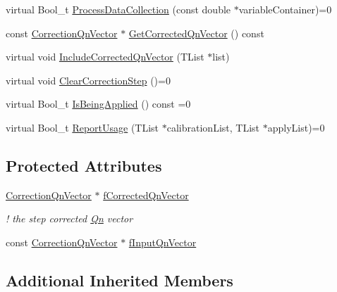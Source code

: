 \begin{DoxyCompactItemize}
\item 
virtual Bool\+\_\+t \mbox{\hyperlink{classQn_1_1CorrectionOnQvector_a2c0a668d885b5a42503869303c859a0b}{Process\+Data\+Collection}} (const double $\ast$variable\+Container)=0
\item 
const \mbox{\hyperlink{classQn_1_1CorrectionQnVector}{Correction\+Qn\+Vector}} $\ast$ \mbox{\hyperlink{classQn_1_1CorrectionOnQvector_a3d6ef2f88326076972684d1d4115f5ab}{Get\+Corrected\+Qn\+Vector}} () const
\item 
virtual void \mbox{\hyperlink{classQn_1_1CorrectionOnQvector_a42d85f899f00a6e816969d5784c50765}{Include\+Corrected\+Qn\+Vector}} (T\+List $\ast$list)
\item 
virtual void \mbox{\hyperlink{classQn_1_1CorrectionOnQvector_aeba6db851f1a9ac5c6fd7adbd81de140}{Clear\+Correction\+Step}} ()=0
\item 
virtual Bool\+\_\+t \mbox{\hyperlink{classQn_1_1CorrectionOnQvector_a4d47a1c241b4bfd5ac98d6fdbc90eb79}{Is\+Being\+Applied}} () const =0
\item 
virtual Bool\+\_\+t \mbox{\hyperlink{classQn_1_1CorrectionOnQvector_a322860c299f0ca1db46ddd57c0828ba1}{Report\+Usage}} (T\+List $\ast$calibration\+List, T\+List $\ast$apply\+List)=0
\end{DoxyCompactItemize}
\subsection*{Protected Attributes}
\begin{DoxyCompactItemize}
\item 
\mbox{\label{classQn_1_1CorrectionOnQvector_aa89ec5735e25de58957161ef4a909cfa}} 
\mbox{\hyperlink{classQn_1_1CorrectionQnVector}{Correction\+Qn\+Vector}} $\ast$ \mbox{\hyperlink{classQn_1_1CorrectionOnQvector_aa89ec5735e25de58957161ef4a909cfa}{f\+Corrected\+Qn\+Vector}}
\begin{DoxyCompactList}\small\item\em ! the step corrected \mbox{\hyperlink{namespaceQn}{Qn}} vector \end{DoxyCompactList}\item 
const \mbox{\hyperlink{classQn_1_1CorrectionQnVector}{Correction\+Qn\+Vector}} $\ast$ \mbox{\hyperlink{classQn_1_1CorrectionOnQvector_a6579bcaa376e434aa5399f8cdbbd60dd}{f\+Input\+Qn\+Vector}}
\end{DoxyCompactItemize}
\subsection*{Additional Inherited Members}


